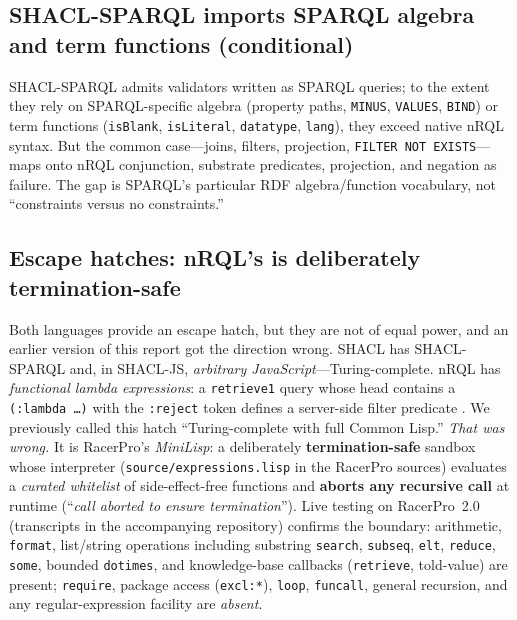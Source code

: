 \documentclass[11pt,letterpaper]{article}
\theoremstyle{definition}
\newcommand{\nrql}{nRQL}
\newcommand{\racer}{RacerPro}
\newcommand{\shacl}{SHACL}
\newcommand{\naf}{negation as failure}
\newcommand{\rdf}{RDF}
\begin{document}
\subsection{SHACL-SPARQL imports SPARQL algebra and term functions (conditional)}
\shacl{}-SPARQL admits validators written as SPARQL queries; to the extent they rely on SPARQL-specific algebra (property paths, \texttt{MINUS}, \texttt{VALUES}, \texttt{BIND}) or term functions (\texttt{isBlank}, \texttt{isLiteral}, \texttt{datatype}, \texttt{lang}), they exceed native \nrql{} syntax. But the common case---joins, filters, projection, \texttt{FILTER NOT EXISTS}---maps onto \nrql{} conjunction, substrate predicates, projection, and \naf{}. The gap is SPARQL's particular \rdf{} algebra/function vocabulary, not ``constraints versus no constraints.''

\subsection{Escape hatches: \nrql{}'s is deliberately termination-safe}\label{sec:hatch}
Both languages provide an escape hatch, but they are not of equal power, and an earlier version of this report got the direction wrong. \shacl{} has \shacl{}-SPARQL and, in \shacl{}-JS, \emph{arbitrary JavaScript}---Turing-complete. \nrql{} has \emph{functional lambda expressions}: a \texttt{retrieve1} query whose head contains a \texttt{(:lambda \dots)} with the \texttt{:reject} token defines a server-side filter predicate \cite[pp.~146--148]{racerug}. We previously called this hatch ``Turing-complete with full Common Lisp.'' \emph{That was wrong.} It is \racer{}'s \emph{MiniLisp}: a deliberately \textbf{termination-safe} sandbox whose interpreter (\texttt{source/expressions.lisp} in the \racer{} sources) evaluates a \emph{curated whitelist} of side-effect-free functions and \textbf{aborts any recursive call} at runtime (``\textit{call aborted to ensure termination}''). Live testing on \racer{}~2.0 (transcripts in the accompanying repository) confirms the boundary: arithmetic, \texttt{format}, list/string operations including substring \texttt{search}, \texttt{subseq}, \texttt{elt}, \texttt{reduce}, \texttt{some}, bounded \texttt{dotimes}, and knowledge-base callbacks (\texttt{retrieve}, told-value) are present; \texttt{require}, package access (\texttt{excl:*}), \texttt{loop}, \texttt{funcall}, general recursion, and any regular-expression facility are \emph{absent}.
\end{document}
